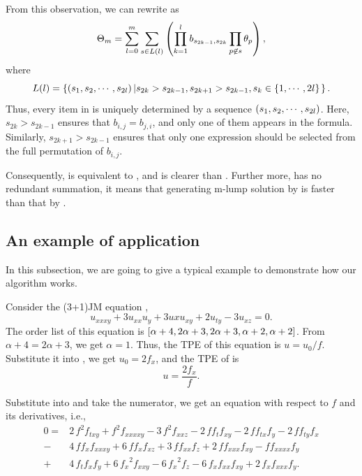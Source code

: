 From this observation, we can rewrite  as
\begin{equation}
    \Theta_m=\sum_{l=0}^m\sum_{s\in L(l)}\left(\prod_{k=1}^l{b_{s_{2k-1},s_{2k}}}\prod_{p\not\in s}{\theta_p}\right), \label{f-lump-new}
\end{equation}
where 
\begin{equation}
    L(l)=\left\{\left(s_1, s_2, \cdots ,s_{2l}\right)\left|s_{2k}>s_{2k-1},s_{2k+1}>s_{2k-1},s_k\in \left\{1,\cdots,2l\right\}\right.\right\}.
\end{equation}
Thus, every item in  is uniquely determined by a sequence $\left(s_1, s_2, \cdots ,s_{2l}\right)$. Here, $s_{2k}>s_{2k-1}$ ensures that $b_{i,j}=b_{j,i}$, and only one of them appears in the formula. Similarly, $s_{2k+1}>s_{2k-1}$ ensures that only one expression should be selected from the full permutation of $b_{i,j}$. 

Consequently,  is equivalent to , and  is clearer than . Further more,  has no redundant summation, it means that generating m-lump solution by  is faster than that by . 

\subsection{An example of application}
In this subsection, we are going to give a typical example to demonstrate how our algorithm works. 

Consider the (3+1)JM equation \CITEcaJM,
\begin{equation}
    u_{xxxy}+3u_{xx}u_y+3u{x}u_{xy}+2u_{ty}-3u_{xz}=0. \label{JMEQ3}
\end{equation}
The order list of this equation is $\left[\alpha+4,2\alpha+3,2\alpha+3,\alpha+2,\alpha+2\right]$. From $\alpha+4=2\alpha+3$, we get $\alpha=1$. Thus, the TPE of this equation is $u=u_0/f$. Substitute it into , we get $u_0=2f_x$, and the TPE of  is 
\begin{equation}
u=\frac{2f_x}{f}. \label{JMEQ-tr}    
\end{equation}

Substitute  into  and take the numerator, we get an equation with respect to $f$ and its derivatives, i.e., 
\begin{equation}
\begin{split}
0=&2\,{f}^{2}f_{{{ txy}}}+{f}^{2}f_{{{ xxxxy}}}-3\,{f}^{2}f_{{{ xxz}}}-2\,ff_{{t}}f_{{{ xy}}}-2\,ff_{{{ tx}}}f_{{y}}-2\,ff_{{{ ty}}}f_{{x}}\\
-&4\,ff_{{x}}f_{{{ xxxy}}}+6\,ff_{{x}}f_{{{ xz}}}+3\,ff_{{{ xx}}}f_{{z}}+2\,ff_{{{ xxx}}}f_{{{xy}}}-ff_{{{ xxxx}}}f_{{y}}\\
+&4\,f_{{t}}f_{{x}}f_{{y}}+6\,{f_{{x}}}^{2}f_{{{ xxy}}}-6\,{f_{{x}}}^{2}f_{{z}}-6\,f_{{x}}f_{{{ xx}}}f_{{{ xy}}}+2\,f_{{x}}f_{{{ xxx}}}f_{{y}}. \label{JMEQ-feq}
\end{split}
\end{equation}

